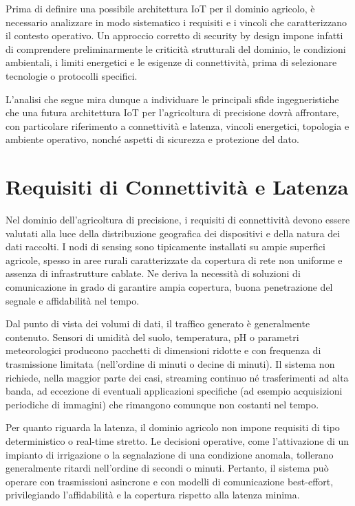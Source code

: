 Prima di definire una possibile architettura IoT per il dominio agricolo, è necessario analizzare in modo sistematico i requisiti e i vincoli che caratterizzano il contesto operativo. Un approccio corretto di security by design impone infatti di comprendere preliminarmente le criticità strutturali del dominio, le condizioni ambientali, i limiti energetici e le esigenze di connettività, prima di selezionare tecnologie o protocolli specifici.

L’analisi che segue mira dunque a individuare le principali sfide ingegneristiche che una futura architettura IoT per l’agricoltura di precisione dovrà affrontare, con particolare riferimento a connettività e latenza, vincoli energetici, topologia e ambiente operativo, nonché aspetti di sicurezza e protezione del dato.

\section{Requisiti di Connettività e Latenza}

Nel dominio dell’agricoltura di precisione, i requisiti di connettività devono essere valutati alla luce della distribuzione geografica dei dispositivi e della natura dei dati raccolti. I nodi di sensing sono tipicamente installati su ampie superfici agricole, spesso in aree rurali caratterizzate da copertura di rete non uniforme e assenza di infrastrutture cablate. Ne deriva la necessità di soluzioni di comunicazione in grado di garantire ampia copertura, buona penetrazione del segnale e affidabilità nel tempo.

Dal punto di vista dei volumi di dati, il traffico generato è generalmente contenuto. Sensori di umidità del suolo, temperatura, pH o parametri meteorologici producono pacchetti di dimensioni ridotte e con frequenza di trasmissione limitata (nell’ordine di minuti o decine di minuti). Il sistema non richiede, nella maggior parte dei casi, streaming continuo né trasferimenti ad alta banda, ad eccezione di eventuali applicazioni specifiche (ad esempio acquisizioni periodiche di immagini) che rimangono comunque non costanti nel tempo.

Per quanto riguarda la latenza, il dominio agricolo non impone requisiti di tipo deterministico o real-time stretto. Le decisioni operative, come l’attivazione di un impianto di irrigazione o la segnalazione di una condizione anomala, tollerano generalmente ritardi nell’ordine di secondi o minuti. Pertanto, il sistema può operare con trasmissioni asincrone e con modelli di comunicazione best-effort, privilegiando l’affidabilità e la copertura rispetto alla latenza minima.

